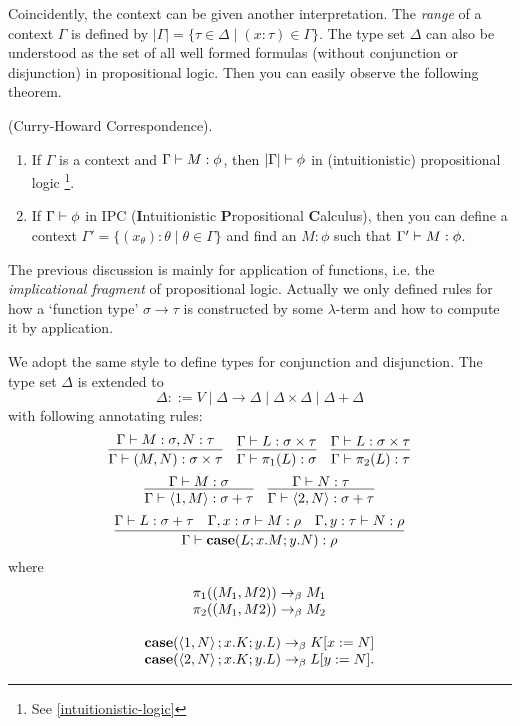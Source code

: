 Coincidently, the context can be given another interpretation. The 
{\it range} of a context $\Gamma$ is defined by
$|\Gamma|=\{\tau\in\Delta\mid(x:\tau)\in\Gamma\}$. The type set $\Delta$
can also be understood as the set of all well formed formulas (without
conjunction or disjunction) in propositional logic. Then you can easily 
observe the following theorem.
\begin{theorem}
    (Curry-Howard Correspondence).
    \begin{enumerate}
        \item If $\Gamma$ is a context and $\Gamma\vdash M:\phi$, then
        $|\Gamma| \vdash \phi$ in (intuitionistic) propositional logic
        \footnote{See \autoref{intuitionistic-logic}}.
        \item If $\Gamma\vdash \phi$ in IPC 
        ({\bf I}ntuitionistic {\bf P}ropositional {\bf C}alculus), then
        you can define a context $\Gamma'=\{(x_\theta):\theta\mid\theta\in\Gamma\}$
        and find an $M: \phi$ such that $\Gamma'\vdash M:\phi$. 
    \end{enumerate}
\end{theorem}

The previous discussion is mainly for application of functions, 
i.e. the {\it implicational fragment} of propositional logic.
Actually we only defined rules for how a `function type' $\sigma\to\tau$
is constructed by some $\lambda$-term and how to compute it by application.

We adopt the same style to define types for conjunction and disjunction.
The type set $\Delta$ is extended to
$$
\Delta ::= V\mid\Delta\to\Delta\mid\Delta\times\Delta\mid\Delta+\Delta
$$
with following annotating rules:
$$
\infer{\Gamma\proves (M, N): \sigma\times\tau}{\Gamma\proves M:\sigma, N:\tau}
\ \ \ 
\infer{\Gamma\proves \pi_1(L):\sigma}{\Gamma\proves L: \sigma\times\tau}
\ \ \ 
\infer{\Gamma\proves \pi_2(L):\tau}{\Gamma\proves L: \sigma\times\tau}
$$
$$
\infer{\Gamma\proves \left<1, M\right>:\sigma + \tau}{\Gamma\proves M:\sigma}
\ \ \ 
\infer{\Gamma\proves \left<2, N\right>:\sigma + \tau}{\Gamma\proves N:\tau}
$$
$$
\infer{\Gamma\proves \text{\bf case}(L;x.M;y.N): \rho}{
    \Gamma\proves L:\sigma+\tau &
    \Gamma, x:\sigma\proves M:\rho &
    \Gamma, y:\tau\proves N:\rho
}
$$
where 
$$
\begin{array}{c}
    \pi_1((M_1, M2)) \to_\beta M_1 \\
    \pi_2((M_1, M2)) \to_\beta M_2 \\
    \\
    \text{\bf case}(\left<1, N\right>;x.K;y.L)\to_\beta K[x:=N] \\ 
    \text{\bf case}(\left<2, N\right>;x.K;y.L)\to_\beta L[y:=N].
\end{array}
$$

